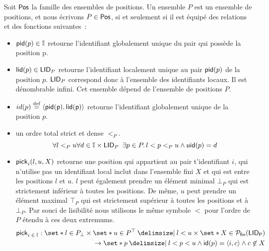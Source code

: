 \begin{definition}[Positions]\label{def:pos}
Soit $\trm{Pos}$ la famille des ensembles de positions.
Un ensemble $P$ est un ensemble de positions, et nous écrivons $P \in \trm{Pos}$, si et seulement si il est équipé des relations et des fonctions suivantes~:
\begin{itemize}
\item $\trm{pid}(p) \in \mathbb{I}$ retourne l'identifiant globalement unique du pair qui possède la position p.

\item $\trm{lid}(p) \in \trm{LID}_P$ retourne l'identifiant localement unique au pair $\trm{pid}(p)$ de la position $p$.
$\trm{LID}_P$ correspond donc à l'ensemble des identifiants locaux.
Il est dénombrable infini.
Cet ensemble dépend de l'ensemble de positions $P$.

\item $id(p) \defeq \tuple*{\trm{\trm{pid}(p), \trm{lid}(p)}}$ retourne l'identifiant globalement unique de la position $p$.
\item un ordre total strict et dense $<_P$.
\begin{equation*}
\forall l <_P u \forall d \in \mathbb{I} \times \trm{LID}_P\ \exists p \in P \qsep l < p <_P u \land \trm{uid}(p) = d
\end{equation*}

\item $\trm{pick}_i(l, u, X)$ retourne une position qui appartient au pair t'identifiant $i$, qui n'utilise pas un identifiant local inclut dans l'ensemble fini $X$ et qui est entre les positions $l$ et $u$.
$l$ peut également prendre un élément minimal $\bot_P$ qui est strictement inférieur à toutes les positions.
De même, $u$ peut prendre un élément maximal $\top_P$ qui est strictement supérieur à toutes les positions et à $\bot_P$.
Par souci de lisibilité nous utilisons le même symbole $<$ pour l'ordre de $P$ étendu à ces deux extremums.
\begin{equation*}\begin{split}
    \trm{pick}_{i\;\in\;\mathbb{I}}: \set*{l \in P_{\bot}} \times \set*{u \in P^{\top} \given l < u} \times \set*{X \in \powerfset{\trm{LID_P}}}\\
    \to \set*{p \given l < p < u \land \trm{id}(p) = \tuple*{i, c} \land c \not\in X}
\end{split}\end{equation*}
\end{itemize}
\end{definition}

